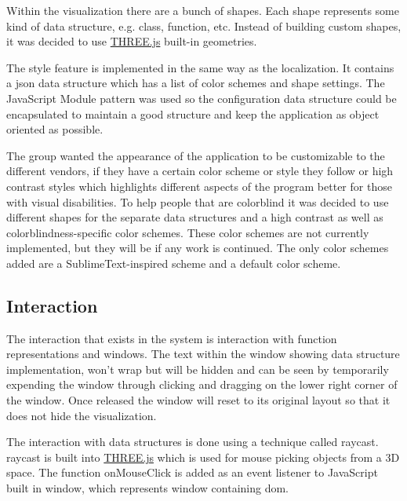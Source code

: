 Within the visualization there are a bunch of shapes. Each shape represents some kind of data structure, e.g. class, function, etc. Instead of building custom shapes, it was decided to use \href{https://threejs.org/}{THREE.js} built-in geometries. 

The style feature is implemented in the same way as the localization. It contains a \gls{json} data structure which has a list of color schemes and shape settings. The JavaScript Module pattern was used so the configuration data structure could be encapsulated to maintain a good structure and keep the application as object oriented as possible. 

The group wanted the appearance of the application to be customizable to the different vendors, if they have a certain color scheme or style they follow or high contrast styles which highlights different aspects of the program better for those with visual disabilities. To help people that are colorblind it was decided to use different shapes for the separate data structures and a high contrast as well as colorblindness-specific color schemes. These color schemes are not currently implemented, but they will be if any work is continued. The only color schemes added are a SublimeText-inspired scheme and a default color scheme.


\subsection{Interaction}

The interaction that exists in the system is interaction with function representations and windows. The text within the window showing data structure implementation, won't wrap but will be hidden and can be seen by temporarily expending the window through clicking and dragging on the lower right corner of the window. Once released the window will reset to its original layout so that it does not hide the visualization.

The interaction with data structures is done using a technique called \gls{raycast}. \Gls{raycast} is built into \href{https://threejs.org/}{THREE.js} which is used for mouse picking objects from a 3D space. The function onMouseClick is added as an event listener to JavaScript built in window, which represents window containing \gls{dom}.

